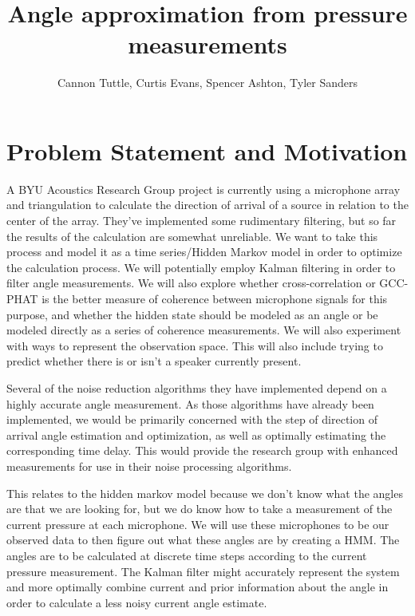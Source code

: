 \documentclass[11pt]{amsart}
\begin{document}
\title{Angle approximation from pressure measurements}
\author{Cannon Tuttle, Curtis Evans, Spencer Ashton, Tyler Sanders}

\date{}

\maketitle

\begin{abstract}
    
\end{abstract}

\section{Problem Statement and Motivation}
A BYU Acoustics Research Group project is currently using a microphone array and triangulation to calculate the direction of arrival of a 
source in relation to the center of the array. They’ve implemented some rudimentary filtering, but so far the results of the calculation are 
somewhat unreliable. We want to take this process and model it as a time series/Hidden Markov model in order to optimize the calculation process. 
We will potentially employ Kalman filtering in order to filter angle measurements. We will also explore whether cross-correlation or GCC-PHAT 
is the better measure of coherence between microphone signals for this purpose, and whether the hidden state should be modeled as an angle or 
be modeled directly as a series of coherence measurements. We will also experiment with ways to represent the observation space. This will also 
include trying to predict whether there is or isn’t a speaker currently present.


Several of the noise reduction algorithms they have implemented depend on a highly accurate angle measurement. As those algorithms have already been 
implemented, we would be primarily concerned with the step of direction of arrival angle estimation and optimization, as well as optimally estimating 
the corresponding time delay. This would provide the research group with enhanced measurements for use in their noise processing algorithms.
	

This relates to the hidden markov model because we don’t know what the angles are that we are looking for, but we do know how to take a measurement of 
the current pressure at each microphone. We will use these microphones to be our observed data to then figure out what these angles are by creating a HMM. 
The angles are to be calculated at discrete time steps according to the current pressure measurement. The Kalman filter might accurately represent the 
system and more optimally combine current and prior information about the angle in order to calculate a less noisy current angle estimate.
\end{document}
